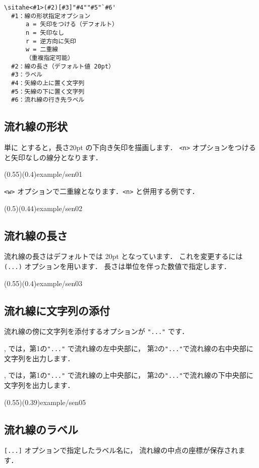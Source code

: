 \documentclass[a4j]{jarticle}
\begin{document}
\begin{boxnote}
\begin{verbatim}
\sitahe<#1>(#2)[#3]"#4""#5"`#6'
  #1：線の形状指定オプション
      a = 矢印をつける（デフォルト）
      n = 矢印なし
      r = 逆方向に矢印
      w = 二重線
      （重複指定可能） 
  #2：線の長さ（デフォルト値 20pt）
  #3：ラベル
  #4：矢線の上に置く文字列
  #5：矢線の下に置く文字列
  #6：流れ線の行き先ラベル
\end{verbatim}
\end{boxnote}

\subsection{流れ線の形状}
単に  とすると，長さ20pt の下向き矢印を描画します．
\texttt{<n>} オプションをつけると矢印なしの線分となります．

(0.55)(0.4){example/sen01}

\texttt{<w>} オプションで二重線となります．\texttt{<n>} と併用する例です．

(0.5)(0.44){example/sen02}

\subsection{流れ線の長さ}
流れ線の長さはデフォルトでは 20pt となっています．
これを変更するには \texttt{(...)} オプションを用います．
長さは単位を伴った数値で指定します．

(0.55)(0.4){example/sen03}

\subsection{流れ線に文字列の添付}
流れ線の傍に文字列を添付するオプションが \texttt{"..."} です．
\begin{jquotation}
,  では，第1の\texttt{"..."} で流れ線の左中央部に，
第2の\texttt{"..."}で流れ線の右中央部に文字列を出力します．

,  では，第1の\texttt{"..."} で流れ線の上中央部に，
第2の\texttt{"..."}で流れ線の下中央部に文字列を出力します．
\end{jquotation}

\showexample[流れ線に文字列を添付](0.55)(0.39){example/sen05}

\subsection{流れ線のラベル}
\texttt{[...]} オプションで指定したラベル名に，
流れ線の中点の座標が保存されます．
\end{document}
